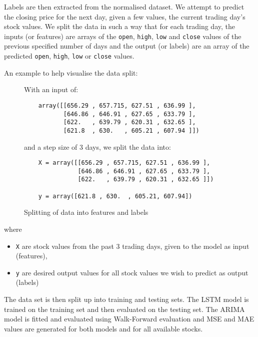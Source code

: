 \pagebreak

Labels are then extracted from the normalised dataset. We attempt to predict the closing price for the next day, given a few values, the current trading day's stock values. We split the data in such a way that for each trading day, the inputs (or features) are arrays of the \texttt{open}, \texttt{high}, \texttt{low} and \texttt{close} values of the previous specified number of days and the output (or labels) are an array of the predicted \texttt{open}, \texttt{high}, \texttt{low} or \texttt{close} values.

An example to help visualise the data split:


\begin{figure}[H]
    With an input of:
    \begin{verbatim}
    array([[656.29 , 657.715, 627.51 , 636.99 ],
           [646.86 , 646.91 , 627.65 , 633.79 ],
           [622.   , 639.79 , 620.31 , 632.65 ],
           [621.8  , 630.   , 605.21 , 607.94 ]])       
    \end{verbatim}
    and a step size of 3 days, we split the data into:
    \begin{verbatim}
    X = array([[656.29 , 657.715, 627.51 , 636.99 ],
               [646.86 , 646.91 , 627.65 , 633.79 ],
               [622.   , 639.79 , 620.31 , 632.65 ]])
        
    y = array([621.8 , 630.  , 605.21, 607.94])
    \end{verbatim}
    \caption{Splitting of data into features and labels}
    \label{code:features_labels}
\end{figure}

where 
\begin{itemize}[nosep]
    \item[] \texttt{X} are stock values from the past 3 trading days, given to the model as input (features),
    \item[] \texttt{y} are desired output values for all stock values we wish to predict as output (labels)
\end{itemize}

The data set is then split up into training and testing sets. The LSTM model is trained on the training set and then evaluated on the testing set. The ARIMA model is fitted and evaluated using Walk-Forward evaluation and MSE and MAE values are generated for both models and for all available stocks.


